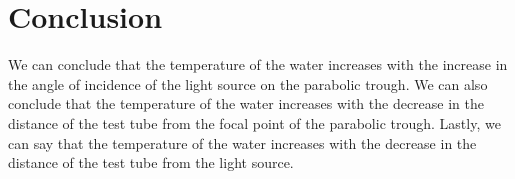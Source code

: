 \documentclass[a4paper, 12pt, english]{article}
\begin{document}
\section{Conclusion}
We can conclude that the temperature of the water increases with the increase in
the angle of incidence of the light source on the parabolic trough. We can also
conclude that the temperature of the water increases with the decrease in the
distance of the test tube from the focal point of the parabolic trough. Lastly, we
can say that the temperature of the water increases with the decrease in the
distance of the test tube from the light source.
\end{document}
